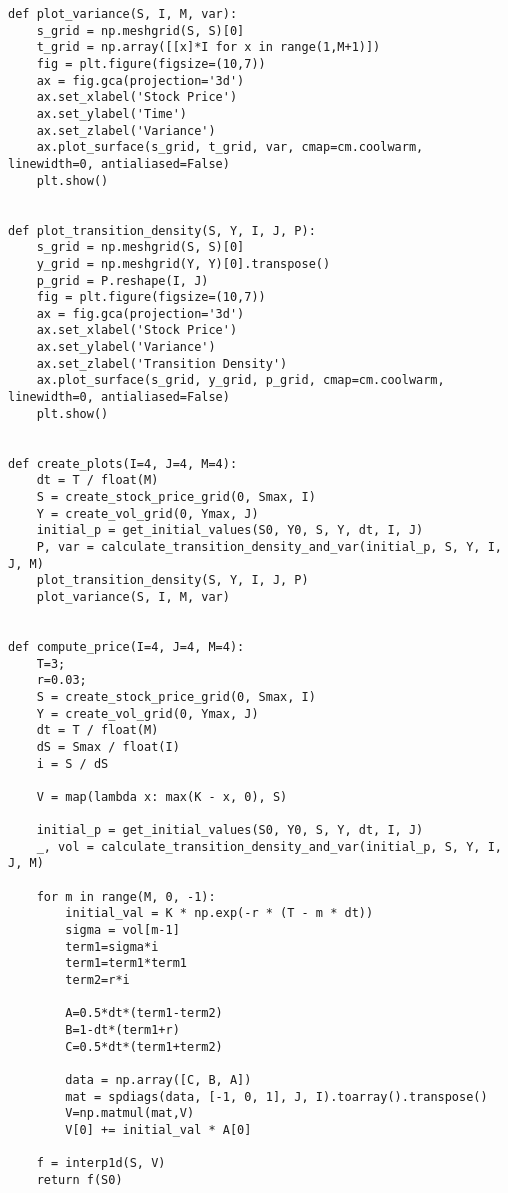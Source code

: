\documentclass{article}
\begin{document}
\begin{lstlisting}
def plot_variance(S, I, M, var):
    s_grid = np.meshgrid(S, S)[0]
    t_grid = np.array([[x]*I for x in range(1,M+1)])
    fig = plt.figure(figsize=(10,7))
    ax = fig.gca(projection='3d')
    ax.set_xlabel('Stock Price')
    ax.set_ylabel('Time')
    ax.set_zlabel('Variance')
    ax.plot_surface(s_grid, t_grid, var, cmap=cm.coolwarm, linewidth=0, antialiased=False)
    plt.show()


def plot_transition_density(S, Y, I, J, P):
    s_grid = np.meshgrid(S, S)[0]
    y_grid = np.meshgrid(Y, Y)[0].transpose()
    p_grid = P.reshape(I, J)
    fig = plt.figure(figsize=(10,7))
    ax = fig.gca(projection='3d')
    ax.set_xlabel('Stock Price')
    ax.set_ylabel('Variance')
    ax.set_zlabel('Transition Density')
    ax.plot_surface(s_grid, y_grid, p_grid, cmap=cm.coolwarm, linewidth=0, antialiased=False)
    plt.show()


def create_plots(I=4, J=4, M=4):
    dt = T / float(M)
    S = create_stock_price_grid(0, Smax, I)
    Y = create_vol_grid(0, Ymax, J)
    initial_p = get_initial_values(S0, Y0, S, Y, dt, I, J)
    P, var = calculate_transition_density_and_var(initial_p, S, Y, I, J, M)
    plot_transition_density(S, Y, I, J, P)
    plot_variance(S, I, M, var)


def compute_price(I=4, J=4, M=4):
    T=3;
    r=0.03;
    S = create_stock_price_grid(0, Smax, I)
    Y = create_vol_grid(0, Ymax, J)
    dt = T / float(M)
    dS = Smax / float(I)
    i = S / dS

    V = map(lambda x: max(K - x, 0), S)

    initial_p = get_initial_values(S0, Y0, S, Y, dt, I, J)
    _, vol = calculate_transition_density_and_var(initial_p, S, Y, I, J, M)

    for m in range(M, 0, -1):
        initial_val = K * np.exp(-r * (T - m * dt))
        sigma = vol[m-1]
        term1=sigma*i
        term1=term1*term1
        term2=r*i

        A=0.5*dt*(term1-term2)
        B=1-dt*(term1+r)
        C=0.5*dt*(term1+term2)

        data = np.array([C, B, A])
        mat = spdiags(data, [-1, 0, 1], J, I).toarray().transpose()
        V=np.matmul(mat,V)
        V[0] += initial_val * A[0]

    f = interp1d(S, V)
    return f(S0)
\end{lstlisting}
\end{document}
